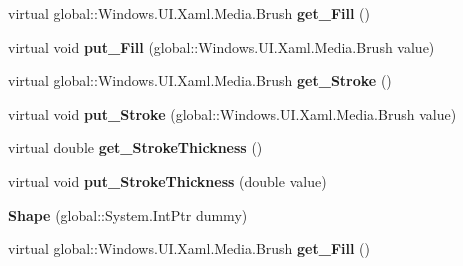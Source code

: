 \begin{DoxyCompactItemize}
\mbox{\label{class_windows_1_1_u_i_1_1_xaml_1_1_shapes_1_1_shape_a10c17e0315cc803297aef00e98586e85}} 
virtual global\+::\+Windows.\+U\+I.\+Xaml.\+Media.\+Brush {\bfseries get\+\_\+\+Fill} ()
\item 
\mbox{\label{class_windows_1_1_u_i_1_1_xaml_1_1_shapes_1_1_shape_ab293dba968233df2740d66a0e1f23957}} 
virtual void {\bfseries put\+\_\+\+Fill} (global\+::\+Windows.\+U\+I.\+Xaml.\+Media.\+Brush value)
\item 
\mbox{\label{class_windows_1_1_u_i_1_1_xaml_1_1_shapes_1_1_shape_ac48e00b135fa8e1130bee32942bbee5c}} 
virtual global\+::\+Windows.\+U\+I.\+Xaml.\+Media.\+Brush {\bfseries get\+\_\+\+Stroke} ()
\item 
\mbox{\label{class_windows_1_1_u_i_1_1_xaml_1_1_shapes_1_1_shape_a801ec283f413b3ba03d57ce8b2bccdc0}} 
virtual void {\bfseries put\+\_\+\+Stroke} (global\+::\+Windows.\+U\+I.\+Xaml.\+Media.\+Brush value)
\item 
\mbox{\label{class_windows_1_1_u_i_1_1_xaml_1_1_shapes_1_1_shape_a758d9f0e1b12c843580d28f3254f63ca}} 
virtual double {\bfseries get\+\_\+\+Stroke\+Thickness} ()
\item 
\mbox{\label{class_windows_1_1_u_i_1_1_xaml_1_1_shapes_1_1_shape_a3bfb547dd85a92a03c0f72a2ca6af30d}} 
virtual void {\bfseries put\+\_\+\+Stroke\+Thickness} (double value)
\item 
\mbox{\label{class_windows_1_1_u_i_1_1_xaml_1_1_shapes_1_1_shape_aef3c79f20646c23080a348eb29a0394e}} 
{\bfseries Shape} (global\+::\+System.\+Int\+Ptr dummy)
\item 
\mbox{\label{class_windows_1_1_u_i_1_1_xaml_1_1_shapes_1_1_shape_a10c17e0315cc803297aef00e98586e85}} 
virtual global\+::\+Windows.\+U\+I.\+Xaml.\+Media.\+Brush {\bfseries get\+\_\+\+Fill} ()
\item 

\end{DoxyCompactItemize}
